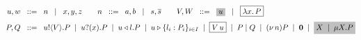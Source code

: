 	\begin{figure}[t]
		\begin{align*}
			u,w  & \bnfis n \bnfbar x,y,z 
			\qquad
			n  \bnfis a,b \bnfbar s, \dual{s} 
			\qquad
			V,W  \bnfis \nonhosyntax{u} \bnfbar \nonpisyntax{\abs{x}{P}}
			\\[1mm]
			P,Q
			 & \bnfis 
			\bout{u}{V}{P}  \sbnfbar  \binp{u}{x}{P} \sbnfbar
			\bsel{u}{l} P \sbnfbar \bbra{u}{l_i:P_i}_{i \in I} \sbnfbar \nonpisyntax{\appl{V}{u}} \sbnfbar P\Par Q \sbnfbar \news{n} P 
			\sbnfbar \inact \sbnfbar \nonhosyntax{\rvar{X} \sbnfbar \recp{X}{P}}
		\end{align*}
	\caption{}
	\label{fig:syntax}
\end{figure}

